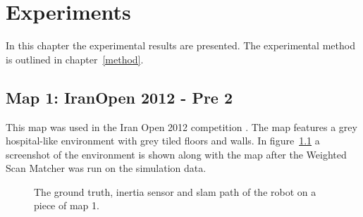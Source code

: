 \chapter{Experiments}
\label{experiments}
In this chapter the experimental results are presented. The experimental method is outlined in chapter~\ref{method}. 

\section{Map 1: IranOpen 2012 - Pre 2}
This map was used in the Iran Open 2012 competition \cite{iran2012}. The map features a grey hospital-like environment with grey tiled floors and walls. In figure~\ref{fig:map1} a screenshot of the environment is shown along with the map after the Weighted Scan Matcher was run on the simulation data. 

\begin{figure}[ht]
\centering
{}
  \caption{The ground truth, inertia sensor and slam path of the robot on a piece of map 1.}
  \label{fig:map1}
\end{figure}

